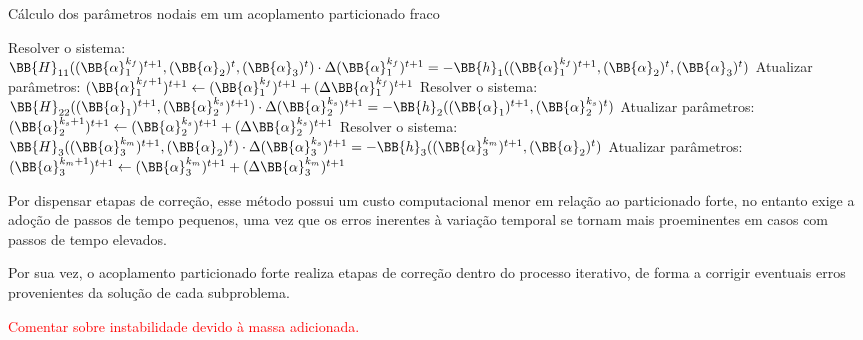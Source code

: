 \documentclass[_ArquivoPrincipal.tex]{subfiles}
\begin{document}
\begin{algorithm}[h]
    \caption{Cálculo dos parâmetros nodais em um acoplamento particionado fraco}
    \label{alg:PartFraco}
    Resolver o sistema: $\BB{H}_{11}((\BB{\alpha}_1^{k_f})^{t+1},(\BB{\alpha}_2)^t,(\BB{\alpha}_3)^t)\cdot\Delta(\BB{\alpha}_1^{k_f})^{t+1}=-\BB{h}_1((\BB{\alpha}_1^{k_f})^{t+1},(\BB{\alpha}_2)^t,(\BB{\alpha}_3)^t)$\;
    Atualizar parâmetros: $(\BB{\alpha}_1^{k_f+1})^{t+1}\gets(\BB{\alpha}_1^{k_f})^{t+1}+(\Delta\BB{\alpha}_1^{k_f})^{t+1}$\;
    Resolver o sistema: $\BB{H}_{22}((\BB{\alpha}_1)^{t+1},(\BB{\alpha}_2^{k_s})^{t+1})\cdot\Delta(\BB{\alpha}_2^{k_s})^{t+1}=-\BB{h}_2((\BB{\alpha}_1)^{t+1},(\BB{\alpha}_2^{k_s})^t)$\;
    Atualizar parâmetros: $(\BB{\alpha}_2^{k_s+1})^{t+1}\gets(\BB{\alpha}_2^{k_s})^{t+1}+(\Delta\BB{\alpha}_2^{k_s})^{t+1}$\;
    Resolver o sistema: $\BB{H}_{3}((\BB{\alpha}_3^{k_m})^{t+1},(\BB{\alpha}_2)^t)\cdot\Delta(\BB{\alpha}_3^{k_s})^{t+1}=-\BB{h}_3((\BB{\alpha}_3^{k_m})^{t+1},(\BB{\alpha}_2)^t)$\;
    Atualizar parâmetros: $(\BB{\alpha}_3^{k_m+1})^{t+1}\gets(\BB{\alpha}_3^{k_m})^{t+1}+(\Delta\BB{\alpha}_3^{k_m})^{t+1}$\;
\end{algorithm}

Por dispensar etapas de correção, esse método possui um custo computacional menor em relação ao particionado forte, no entanto exige a adoção de passos de tempo pequenos, uma vez que os erros inerentes à variação temporal se tornam mais proeminentes em casos com passos de tempo elevados.

Por sua vez, o acoplamento particionado forte realiza etapas de correção dentro do processo iterativo, de forma a corrigir eventuais erros provenientes da solução de cada subproblema.

\textcolor{red}{Comentar sobre instabilidade devido à massa adicionada.}
\end{document}
